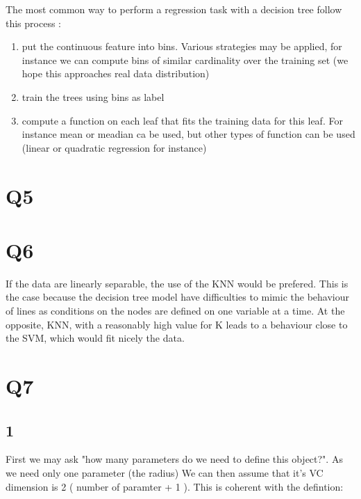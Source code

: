 \documentclass[11pt, a4paper]{article}
\begin{document}
The most common way to perform a regression task with a decision tree follow this process :
\begin{enumerate}
\item put the continuous feature into bins. Various strategies may be applied, for instance we can compute bins of similar cardinality over the training set (we hope this approaches real data distribution)
\item train the trees using bins as label
\item compute a function on each leaf that fits the training data for this leaf. For instance mean or meadian ca be used, but other types of function can be used (linear or quadratic regression for instance)
\end{enumerate}

\section{Q5}

\section{Q6}

If the data are linearly separable, the use of the KNN would be prefered. This is the case because the decision tree model have difficulties to mimic the behaviour of lines as conditions on the nodes are defined on one variable at a time. At the opposite, KNN, with a reasonably high value for K leads to a behaviour close to the SVM, which would fit nicely the data.

\section{Q7} 

\subsection{1}

First we may ask "how many parameters do we need to define this object?". As we need only one parameter (the radius) We can then assume that it's VC dimension is 2 ( number of paramter + 1 ). This is coherent with the defintion: 
\end{document}
